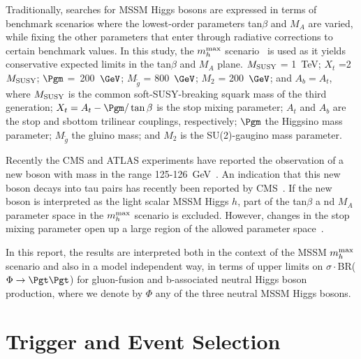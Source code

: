 Traditionally, searches for MSSM Higgs bosons are expressed in terms of benchmark scenarios where 
the lowest-order parameters tan$\beta$ and $M_A$ are varied, while fixing the other parameters that 
enter through radiative corrections to certain benchmark values. 
In this study, the $m_{h}^{\rm max}$ scenario~\cite{MHMAX-Carena,MHMAX-Carena-2002} is used as it 
yields conservative expected limits in the tan$\beta$ and $M_A$ plane. 
$M_{\rm SUSY}$ = 1~TeV; $X_t$ =2$M_{\rm SUSY}$; $\Pgm$ =~200~$\GeV$; $M_{\tilde{g}}$ = 800~$\GeV$; 
$M_2$ = 200~$\GeV$; and $A_b = A_t$, where $M_{\rm SUSY}$ is the common soft-SUSY-breaking squark 
mass of the third generation; $X_t = A_t - \Pgm/\tan\beta$ is the stop mixing parameter; $A_t$ 
and $A_b$ are the stop and sbottom trilinear couplings, respectively; $\Pgm$ the Higgsino mass 
parameter; $M_{\tilde{g}}$ the gluino mass; and $M_2$ is the SU(2)-gaugino mass parameter. 

Recently the CMS and ATLAS experiments have reported the observation of a new boson with mass 
in the range 125-126~GeV~\cite{CMS-HIGGS-DISCOVERY,ATLAS-HIGGS-DISCOVERY}. 
An indication that this new boson decays into tau pairs has recently been reported by 
CMS~\cite{CMS-PAPER-HIG-13-004}.
If the new boson is interpreted as the light scalar MSSM Higgs $h$, part of the tan$\beta$ a
nd $M_A$ parameter space in the $m_{h}^{\rm max}$ scenario is excluded. 
However, changes in the stop mixing parameter open up a large region of the allowed parameter 
space~\cite{Heinemeyer:2011aa,Carena:2013qia}. 

In this report, the results are interpreted both in the context of the MSSM $m_{h}^{\rm max}$ scenario and also in a model independent way, 
in terms of upper limits on $\sigma\cdot$BR($\Phi\to\Pgt\Pgt$) for gluon-fusion and b-associated neutral Higgs boson production,
where we denote by $\Phi$ any of the three neutral MSSM Higgs bosons.




 

\section{Trigger and Event Selection}


